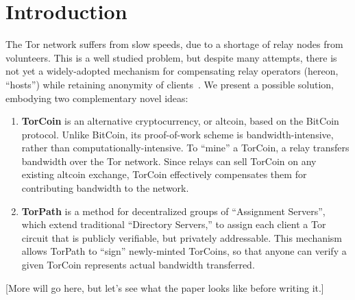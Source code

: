 \section{Introduction}

The Tor network suffers from slow speeds,
due to a shortage of relay nodes from volunteers.
This is a well studied problem, but despite many attempts,
there is not yet a widely-adopted mechanism
for compensating relay operators (hereon, ``hosts'')
while retaining anonymity of clients~\cite{raykova-pet2008, wpes09-xpay, incentives-fc10, ccs10-braids, acsac11-tortoise, jansen2013lira, johnson2013onions}.
We present a possible solution, embodying two complementary novel ideas:

\begin{enumerate}
\item \textbf{TorCoin} is an alternative cryptocurrency, or altcoin, based on the BitCoin protocol. Unlike BitCoin, its proof-of-work scheme is bandwidth-intensive, rather than computationally-intensive. To ``mine'' a TorCoin, a relay transfers bandwidth over the Tor network. Since relays can sell TorCoin on any existing altcoin exchange, TorCoin effectively compensates them for contributing bandwidth to the network.

\item \textbf{TorPath} is a method for decentralized groups of ``Assignment Servers'', which extend traditional ``Directory Servers,'' to assign each client a Tor circuit that is publicly verifiable, but privately addressable. This mechanism allows TorPath to ``sign'' newly-minted TorCoins, so that anyone can verify a given TorCoin represents actual bandwidth transferred. 
\end{enumerate}

[More will go here, but let's see what the paper looks like before writing it.]
